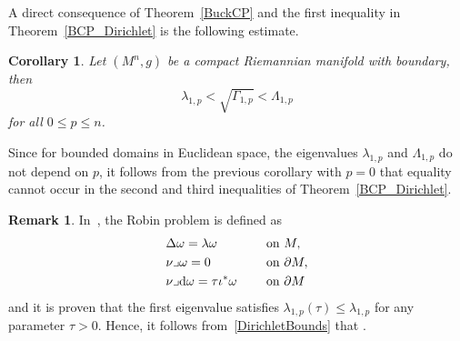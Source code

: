 \documentclass[pdftex]{sigma}
\numberwithin{equation}{section}
\newtheorem{Corollary}[Theorem]{Corollary}
\theoremstyle{definition}
\newtheorem{Remark}[Theorem]{Remark}
\begin{document}
A direct consequence of Theorem~\ref{BuckCP} and the first inequality in Theorem~\ref{BCP_Dirichlet} is the following estimate.
\begin{Corollary}\label{DBCP}
Let $(M^n,g)$ be a compact Riemannian manifold with boundary, then
\begin{equation}\label{DirichletBounds}
\lambda_{1,p}<\sqrt{\Gamma_{1,p}}<\Lambda_{1,p}
\end{equation}
for all $0\leq p\leq n$.
\end{Corollary}

Since for bounded domains in Euclidean space, the eigenvalues $\lambda_{1,p}$ and $\Lambda_{1,p}$ do not depend on $p$, it follows from the previous corollary with $p=0$ that equality cannot occur in the second and third inequalities of Theorem~\ref{BCP_Dirichlet}.

\begin{Remark} In~\cite{elchamiginouxhabib19}, the Robin problem is defined as
\[
\begin{aligned}
&\Delta \omega =\lambda \omega \ \quad&&\textrm{on } M, \\
&\nu\lrcorner\omega =0\ \quad&&\textrm{on }\partial M, \\
&\nu\lrcorner {\rm d}\omega = \tau \iota^*\omega \ \quad && \textrm{on }\partial M
\end{aligned}
\]
and it is proven that the first eigenvalue satisfies $\lambda_{1,p}(\tau)\leq \lambda_{1,p}$ for any parameter $\tau>0$.
Hence, it follows from~\eqref{DirichletBounds} that .
\end{Remark}
\end{document}
